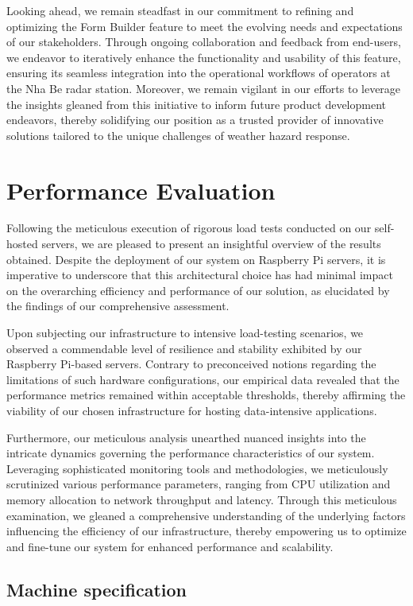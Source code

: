 Looking ahead, we remain steadfast in our commitment to refining and optimizing
the Form Builder feature to meet the evolving needs and expectations of our
stakeholders. Through ongoing collaboration and feedback from end-users, we
endeavor to iteratively enhance the functionality and usability of this feature,
ensuring its seamless integration into the operational workflows of operators at
the Nha Be radar station. Moreover, we remain vigilant in our efforts to
leverage the insights gleaned from this initiative to inform future product
development endeavors, thereby solidifying our position as a trusted provider of
innovative solutions tailored to the unique challenges of weather hazard
response.


\section{Performance Evaluation}
Following the meticulous execution of rigorous load tests conducted on our
self-hosted servers, we are pleased to present an insightful overview of the
results obtained. Despite the deployment of our system on Raspberry Pi servers,
it is imperative to underscore that this architectural choice has had minimal
impact on the overarching efficiency and performance of our solution, as
elucidated by the findings of our comprehensive assessment.

Upon subjecting our infrastructure to intensive load-testing scenarios, we
observed a commendable level of resilience and stability exhibited by our
Raspberry Pi-based servers. Contrary to preconceived notions regarding the
limitations of such hardware configurations, our empirical data revealed that
the performance metrics remained within acceptable thresholds, thereby affirming
the viability of our chosen infrastructure for hosting data-intensive
applications.

Furthermore, our meticulous analysis unearthed nuanced insights into the
intricate dynamics governing the performance characteristics of our system.
Leveraging sophisticated monitoring tools and methodologies, we meticulously
scrutinized various performance parameters, ranging from CPU utilization and
memory allocation to network throughput and latency. Through this meticulous
examination, we gleaned a comprehensive understanding of the underlying factors
influencing the efficiency of our infrastructure, thereby empowering us to
optimize and fine-tune our system for enhanced performance and scalability.

\subsection{Machine specification}

